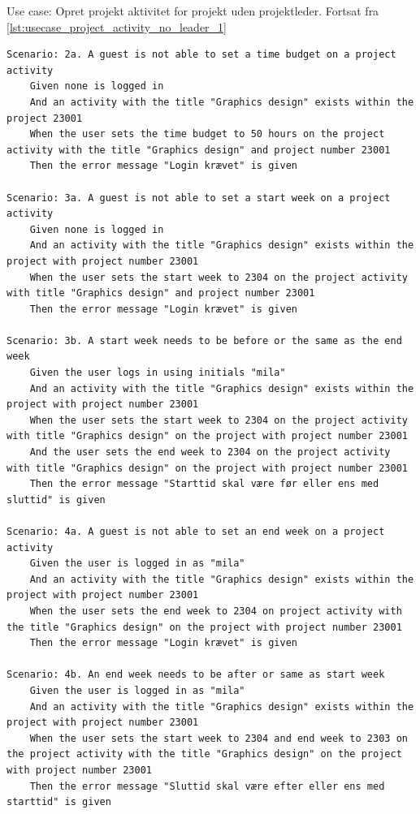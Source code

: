 \begin{listing}
    \centering
    \caption{Use case: Opret projekt aktivitet for projekt uden projektleder. Fortsat fra \cref{lst:usecase_project_activity_no_leader_1}}\label{lst:usecase_project_activity_no_leader_2}
    \begin{verbatim}
Scenario: 2a. A guest is not able to set a time budget on a project activity
    Given none is logged in
    And an activity with the title "Graphics design" exists within the project 23001
    When the user sets the time budget to 50 hours on the project activity with the title "Graphics design" and project number 23001
    Then the error message "Login krævet" is given

Scenario: 3a. A guest is not able to set a start week on a project activity
    Given none is logged in
    And an activity with the title "Graphics design" exists within the project with project number 23001
    When the user sets the start week to 2304 on the project activity with title "Graphics design" and project number 23001
    Then the error message "Login krævet" is given

Scenario: 3b. A start week needs to be before or the same as the end week
    Given the user logs in using initials "mila"
    And an activity with the title "Graphics design" exists within the project with project number 23001
    When the user sets the start week to 2304 on the project activity with title "Graphics design" on the project with project number 23001
    And the user sets the end week to 2304 on the project activity with title "Graphics design" on the project with project number 23001
    Then the error message "Starttid skal være før eller ens med sluttid" is given

Scenario: 4a. A guest is not able to set an end week on a project activity
    Given the user is logged in as "mila"
    And an activity with the title "Graphics design" exists within the project with project number 23001
    When the user sets the end week to 2304 on project activity with the title "Graphics design" on the project with project number 23001
    Then the error message "Login krævet" is given

Scenario: 4b. An end week needs to be after or same as start week
    Given the user is logged in as "mila"
    And an activity with the title "Graphics design" exists within the project with project number 23001
    When the user sets the start week to 2304 and end week to 2303 on the project activity with the title "Graphics design" on the project with project number 23001
    Then the error message "Sluttid skal være efter eller ens med starttid" is given
    \end{verbatim}
\end{listing}\clearpage
